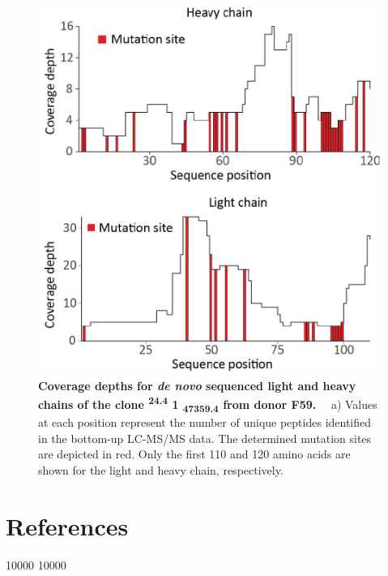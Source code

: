\begin{subappendices}
  \vspace{1cm}

  \begin{figure}[!ht]
    \center
    \includegraphics[]{Chapter.3/Figures/fs10.png}
    \caption{
      \textbf{Coverage depths for \emph{de novo} sequenced light and heavy chains of the clone \textsuperscript{24.4} 1 \textsubscript{47359.4} from donor F59.} ~~a) Values at each position represent the number of unique peptides identified in the bottom-up LC-MS/MS data. The determined mutation sites are depicted in red. Only the first 110 and 120 amino acids are shown for the light and heavy chain, respectively.
    }
    \label{fig:figs3.10}
  \end{figure}

\end{subappendices}

\clearpage
\section*{References}

\patchcmd{\thebibliography}
{}
{ 10000  10000}
{}{}

\stopthumb


